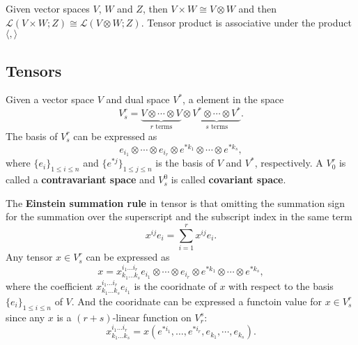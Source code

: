 \begin{theorem}
Given vector spaces $V$, $W$ and $Z$, then $V\times W\cong V\otimes W$ and then $\mathcal{L}(V\times W;Z)\cong\mathcal{L}(V\otimes W;Z)$. Tensor product is associative under the product $\langle,\rangle$
\end{theorem}

\subsection{Tensors}
\begin{definition}
Given a vector space $V$ and dual space $V^*$, a element in the space 
\begin{equation}
V^r_s=\underbrace{V\otimes\cdots\otimes V}_{r\text{ terms}}\otimes \underbrace{V^*\otimes\cdots\otimes V^*}_{s\text{ terms}}.
\end{equation}
The basis of $V^r_s$ can be expressed as
\begin{equation}
e_{i_1}\otimes\cdots\otimes e_{i_r}\otimes e^{*k_1}\otimes\cdots\otimes e^{*k_s},
\end{equation}
where $\{e_i\}_{1\le i\le n}$ and $\{e^{*j}\}_{1\le j\le n}$ is the basis of $V$ and $V^*$, respectively. A $V^r_0$ is called a \textbf{contravariant space} and $V_s^0$ is called \textbf{covariant space}.
\end{definition}

The \textbf{Einstein summation rule} in tensor is that omitting the summation sign for the summation over the superscript and the subscript index in the same term
\begin{equation*}
x^{ij}e_{i}=\sum_{i=1}^rx^{ij}e_i.
\end{equation*}
Any tensor $x\in V^r_s$ can be expressed as
\begin{equation}
x=x^{i_1\dots i_r}_{k_1\dots k_s}e_{i_1}\otimes\cdots\otimes e_{i_r}\otimes e^{*k_1}\otimes\cdots\otimes e^{*k_s},
\end{equation}
where the coefficient $x^{i_1\dots i_r}_{k_1\dots k_s}e_{i_1}$ is the cooridnate of $x$ with respect to the basis $\{e_i\}_{1\le i\le n}$ of $V$. And the cooridnate can be expressed a functoin value for $x\in V^r_s$ since any $x$ is a $(r+s)$-linear function on $V^s_r$:
\begin{equation}
x^{i_1\dots i_r}_{k_1\dots k_s}=x(e^{*i_1},\dots, e^{*i_r},e_{k_1},\cdots, e_{k_s}).
\end{equation}

